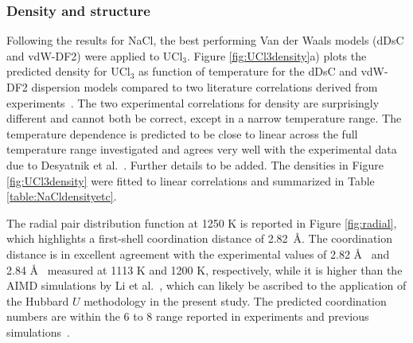 \documentclass[preprint,3p,10pt,onecolumn,number,sort&compress]{elsarticle}
\begin{document}
\subsubsection{Density and structure}
Following the results for NaCl, the best performing Van der Waals models (dDsC and vdW-DF2) were applied to UCl$_3$. Figure \ref{fig:UCl3density}a) plots the predicted density for UCl$_3$ as function of temperature for the dDsC and vdW-DF2 dispersion models compared to two literature correlations derived from experiments~\cite{Janz1988,Desyatnik}.
The two experimental correlations for density are surprisingly different and cannot both be correct, except in a narrow temperature range. 
 The temperature dependence is predicted to be close to linear across the full temperature range investigated and agrees very well with the experimental data due to Desyatnik et al.~\cite{Desyatnik}.  {\color{red}Further details to be added.} %
 The densities in Figure \ref{fig:UCl3density} were fitted to linear correlations and summarized in Table \ref{table:NaCldensityetc}. 
 
The radial pair distribution function at 1250 K is reported in Figure \ref{fig:radial}, which highlights a first-shell coordination distance of 2.82~\AA. The coordination distance is in excellent agreement with the experimental values of 2.82 \AA~\cite{Neilson} and 2.84 \AA~\cite{Okamoto} measured at 1113 K and 1200 K, respectively, while it is higher than the AIMD simulations by Li et al.~\cite{Li}, which can likely be ascribed to the application of the Hubbard $U$ methodology in the present study. The predicted coordination numbers are within the 6 to 8 range reported in experiments and previous simulations~\cite{Li,Neilson,Okamoto}. %
 
\end{document}

